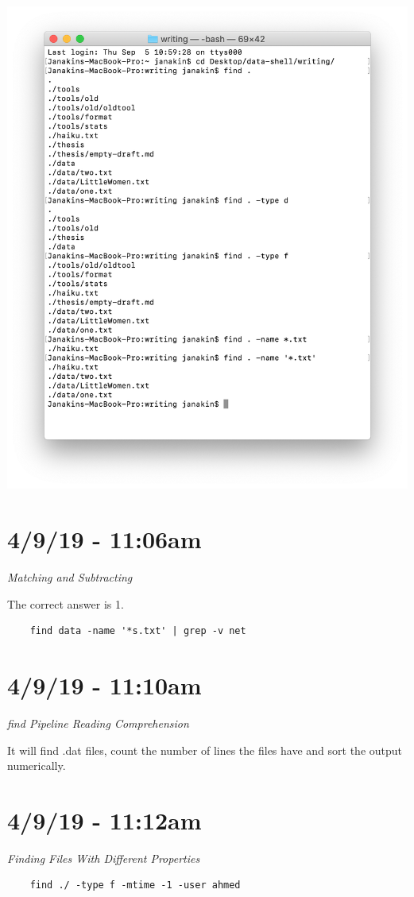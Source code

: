 \documentclass{article}
\begin{document}
\includegraphics[width=\textwidth]{ftd.png}

\section*{4/9/19 - 11:06am}

\textit{Matching and Subtracting}

The correct answer is 1.

\begin{verbatim}
    find data -name '*s.txt' | grep -v net
\end{verbatim}

\section*{4/9/19 - 11:10am}

\textit{find Pipeline Reading Comprehension}

It will find .dat files, count the number of lines the files have and sort the output numerically.

\section*{4/9/19 - 11:12am}

\textit{Finding Files With Different Properties}

\begin{verbatim}
    find ./ -type f -mtime -1 -user ahmed
\end{verbatim}
\end{document}

